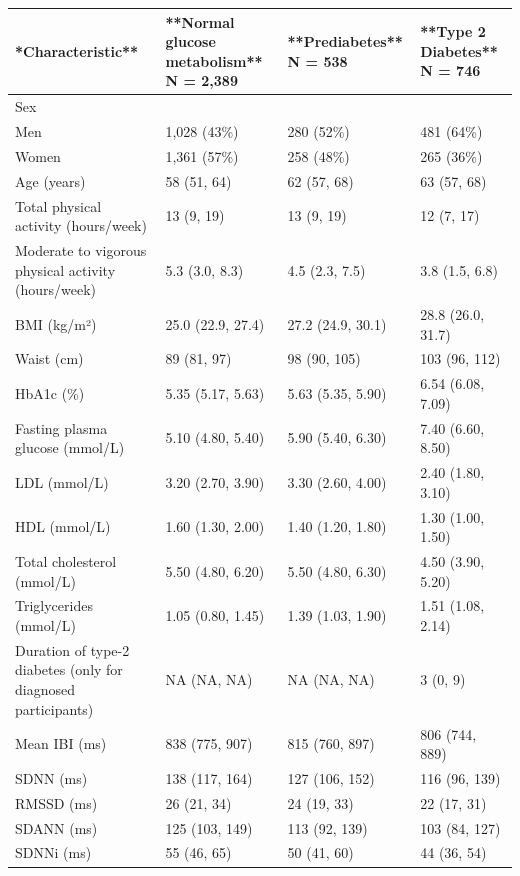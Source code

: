 \documentclass[
  a4paper,
  headsepline=true,
  open=any]{scrbook}
\begin{document}
\begin{table}
\begin{minipage}[t]{\linewidth}
{\begin{tabu} to 
\hline
**Characteristic** & **Normal glucose metabolism**  
N = 2,389 & **Prediabetes**  
N = 538 & **Type 2 Diabetes**  
N = 746\\
\hline
Sex &  &  & \\
\hline
Men & 1,028 (43\%) & 280 (52\%) & 481 (64\%)\\
\hline
Women & 1,361 (57\%) & 258 (48\%) & 265 (36\%)\\
\hline
Age (years) & 58 (51, 64) & 62 (57, 68) & 63 (57, 68)\\
\hline
Total physical activity (hours/week) & 13 (9, 19) & 13 (9, 19) & 12 (7, 17)\\
\hline
Moderate to vigorous physical activity (hours/week) & 5.3 (3.0, 8.3) & 4.5 (2.3, 7.5) & 3.8 (1.5, 6.8)\\
\hline
BMI (kg/m²) & 25.0 (22.9, 27.4) & 27.2 (24.9, 30.1) & 28.8 (26.0, 31.7)\\
\hline
Waist (cm) & 89 (81, 97) & 98 (90, 105) & 103 (96, 112)\\
\hline
HbA1c (\%) & 5.35 (5.17, 5.63) & 5.63 (5.35, 5.90) & 6.54 (6.08, 7.09)\\
\hline
Fasting plasma glucose (mmol/L) & 5.10 (4.80, 5.40) & 5.90 (5.40, 6.30) & 7.40 (6.60, 8.50)\\
\hline
LDL (mmol/L) & 3.20 (2.70, 3.90) & 3.30 (2.60, 4.00) & 2.40 (1.80, 3.10)\\
\hline
HDL (mmol/L) & 1.60 (1.30, 2.00) & 1.40 (1.20, 1.80) & 1.30 (1.00, 1.50)\\
\hline
Total cholesterol (mmol/L) & 5.50 (4.80, 6.20) & 5.50 (4.80, 6.30) & 4.50 (3.90, 5.20)\\
\hline
Triglycerides (mmol/L) & 1.05 (0.80, 1.45) & 1.39 (1.03, 1.90) & 1.51 (1.08, 2.14)\\
\hline
Duration of type-2 diabetes (only for diagnosed participants) & NA (NA, NA) & NA (NA, NA) & 3 (0, 9)\\
\hline
Mean IBI (ms) & 838 (775, 907) & 815 (760, 897) & 806 (744, 889)\\
\hline
SDNN (ms) & 138 (117, 164) & 127 (106, 152) & 116 (96, 139)\\
\hline
RMSSD (ms) & 26 (21, 34) & 24 (19, 33) & 22 (17, 31)\\
\hline
SDANN (ms) & 125 (103, 149) & 113 (92, 139) & 103 (84, 127)\\
\hline
SDNNi (ms) & 55 (46, 65) & 50 (41, 60) & 44 (36, 54)\\

\end{tabu}}
\end{minipage}
\end{table}
\end{document}
